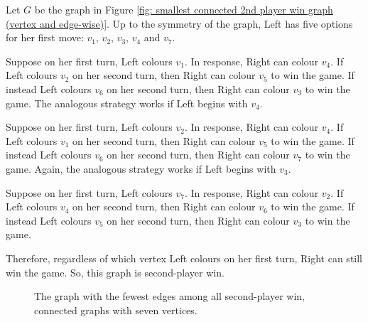 \documentclass[11pt]{article}
\theoremstyle{definition}
\begin{document}
Let $G$ be the graph in Figure \ref{fig: smallest connected 2nd player win
graph (vertex and edge-wise)}. Up to the symmetry of the graph, Left has five
options for her first move: $v_1$, $v_2$, $v_3$, $v_4$ and $v_7$.

Suppose on her first turn, Left colours $v_1$. In response, Right can colour
$v_4$. If Left colours $v_2$ on her second turn, then Right can colour $v_5$ to
win the game. If instead Left colours $v_6$ on her second turn, then Right can
colour $v_3$ to win the game. The analogous strategy works if Left begins with
$v_4$.

Suppose on her first turn, Left colours $v_2$. In response, Right can colour
$v_4$. If Left colours $v_1$ on her second turn, then Right can colour $v_5$ to
win the game. If instead Left colours $v_6$ on her second turn, then Right can
colour $v_7$ to win the game. Again, the analogous strategy works if Left
begins with $v_3$.

Suppose on her first turn, Left colours $v_7$. In response, Right can colour
$v_2$. If Left colours $v_4$ on her second turn, then Right can colour $v_6$ to
win the game. If instead Left colours $v_5$ on her second turn, then Right can
colour $v_3$ to win the game.

Therefore, regardless of which vertex Left colours on her first turn, Right can
still win the game. So, this graph is second-player win.

\begin{figure}
    \centering
    \caption{The graph with the fewest edges among all second-player win,
    connected graphs with seven vertices.}
    \label{fig: smallest connected 2nd player win graph (vertex and edge-wise)}
\end{figure}
\end{document}
